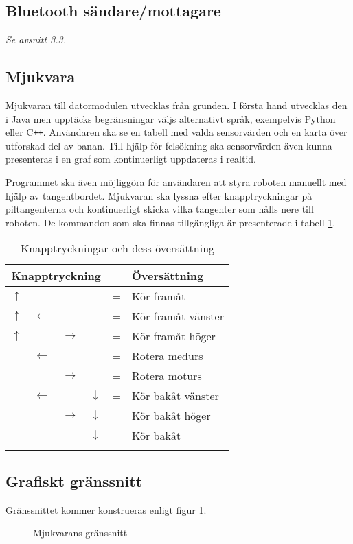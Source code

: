\documentclass[11pt]{article}
\begin{document}
\begin{flushleft}
\subsection{Bluetooth\textsuperscript{\circledR} sändare/mottagare}
\textit{Se avsnitt 3.3.}
\subsection{Mjukvara}
Mjukvaran till datormodulen utvecklas från grunden. I första hand utvecklas den i Java men upptäcks begränsningar väljs alternativt språk, exempelvis Python eller C\texttt{++}. Användaren ska se en tabell med valda sensorvärden och en karta över utforskad del av banan. Till hjälp för felsökning ska sensorvärden även kunna presenteras i en graf som kontinuerligt uppdateras i realtid. 

Programmet ska även möjliggöra för användaren att styra roboten manuellt med hjälp av tangentbordet. Mjukvaran ska lyssna efter knapptryckningar på piltangenterna och kontinuerligt skicka vilka tangenter som hålls nere till roboten. De kommandon som ska finnas tillgängliga är presenterade i tabell \ref{commands}.

\begin{longtable}{|p{.05\linewidth} p{.05\linewidth} p{.05\linewidth} p{.05\linewidth} c l|}
	\multicolumn{4}{c}{\textbf{Knapptryckning}} & & \multicolumn{1}{l}{\textbf{Översättning}} \\ \hline\hline
	$\uparrow$ &  				&  				& 				& = & Kör framåt \\ \hline
	$\uparrow$ & $\leftarrow$	&				&				& = & Kör framåt vänster \\ \hline
	$\uparrow$ &				& $\rightarrow$	&				& = & Kör framåt höger \\ \hline
			   & $\leftarrow$	&				&				& = & Rotera medurs \\ \hline
			   &				& $\rightarrow$	&				& = & Rotera moturs \\ \hline
			   & $\leftarrow$	&				& $\downarrow$	& = & Kör bakåt vänster \\ \hline
			   &				& $\rightarrow$ & $\downarrow$	& = & Kör bakåt höger \\ \hline
			   &				&				& $\downarrow$	& = & Kör bakåt \\ \hline
	\caption{Knapptryckningar och dess översättning} \label{commands}
\end{longtable}

\subsection{Grafiskt gränssnitt}
Gränssnittet kommer konstrueras enligt figur \ref{software}.
\begin{figure}[htbp]
\centering
\noindent\resizebox{.8\textwidth}{!}{
		}
	\caption{Mjukvarans gränssnitt \label{software}}
\end{figure}


\end{flushleft}
\end{document}
